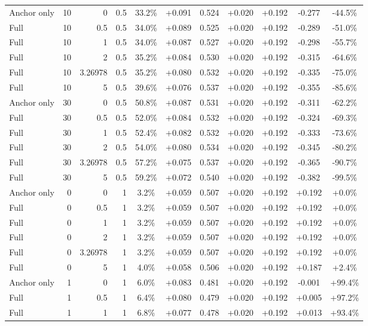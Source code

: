 \begin{table}[htbp]
\begin{tabular}{lrrrccccccc}
Anchor only & 10 & 0 & 0.5 & 33.2\% & +0.091 & 0.524 & +0.020 & +0.192 & -0.277 & -44.5\% \\
Full & 10 & 0.5 & 0.5 & 34.0\% & +0.089 & 0.525 & +0.020 & +0.192 & -0.289 & -51.0\% \\
Full & 10 & 1 & 0.5 & 34.0\% & +0.087 & 0.527 & +0.020 & +0.192 & -0.298 & -55.7\% \\
Full & 10 & 2 & 0.5 & 35.2\% & +0.084 & 0.530 & +0.020 & +0.192 & -0.315 & -64.6\% \\
Full & 10 & 3.26978 & 0.5 & 35.2\% & +0.080 & 0.532 & +0.020 & +0.192 & -0.335 & -75.0\% \\
Full & 10 & 5 & 0.5 & 39.6\% & +0.076 & 0.537 & +0.020 & +0.192 & -0.355 & -85.6\% \\
Anchor only & 30 & 0 & 0.5 & 50.8\% & +0.087 & 0.531 & +0.020 & +0.192 & -0.311 & -62.2\% \\
Full & 30 & 0.5 & 0.5 & 52.0\% & +0.084 & 0.532 & +0.020 & +0.192 & -0.324 & -69.3\% \\
Full & 30 & 1 & 0.5 & 52.4\% & +0.082 & 0.532 & +0.020 & +0.192 & -0.333 & -73.6\% \\
Full & 30 & 2 & 0.5 & 54.0\% & +0.080 & 0.534 & +0.020 & +0.192 & -0.345 & -80.2\% \\
Full & 30 & 3.26978 & 0.5 & 57.2\% & +0.075 & 0.537 & +0.020 & +0.192 & -0.365 & -90.7\% \\
Full & 30 & 5 & 0.5 & 59.2\% & +0.072 & 0.540 & +0.020 & +0.192 & -0.382 & -99.5\% \\
Anchor only & 0 & 0 & 1 & 3.2\% & +0.059 & 0.507 & +0.020 & +0.192 & +0.192 & +0.0\% \\
Full & 0 & 0.5 & 1 & 3.2\% & +0.059 & 0.507 & +0.020 & +0.192 & +0.192 & +0.0\% \\
Full & 0 & 1 & 1 & 3.2\% & +0.059 & 0.507 & +0.020 & +0.192 & +0.192 & +0.0\% \\
Full & 0 & 2 & 1 & 3.2\% & +0.059 & 0.507 & +0.020 & +0.192 & +0.192 & +0.0\% \\
Full & 0 & 3.26978 & 1 & 3.2\% & +0.059 & 0.507 & +0.020 & +0.192 & +0.192 & +0.0\% \\
Full & 0 & 5 & 1 & 4.0\% & +0.058 & 0.506 & +0.020 & +0.192 & +0.187 & +2.4\% \\
Anchor only & 1 & 0 & 1 & 6.0\% & +0.083 & 0.481 & +0.020 & +0.192 & -0.001 & +99.4\% \\
Full & 1 & 0.5 & 1 & 6.4\% & +0.080 & 0.479 & +0.020 & +0.192 & +0.005 & +97.2\% \\
Full & 1 & 1 & 1 & 6.8\% & +0.077 & 0.478 & +0.020 & +0.192 & +0.013 & +93.4\% \\

\end{tabular}
\end{table}
